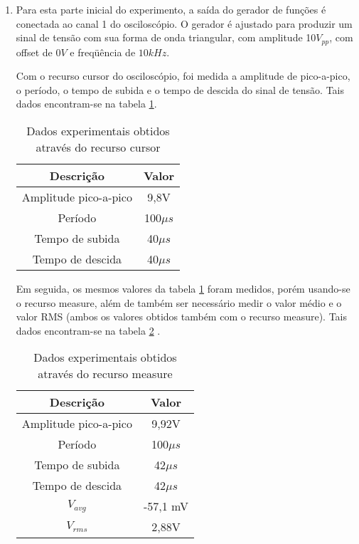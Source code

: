 \documentclass[a4paper]{article} %
\begin{document}
\begin{enumerate}
\item Para esta parte inicial do experimento, a saída do gerador de funções é conectada ao canal 1 do osciloscópio. O gerador é ajustado para produzir um sinal de tensão com sua forma de onda triangular, com amplitude 10$V_{pp}$, com offset de $0V$ e freqüência de $10kHz$. 
 
Com o recurso cursor do osciloscópio, foi medida a amplitude de pico-a-pico, o período, o tempo de subida e o tempo de descida do sinal de tensão. Tais dados encontram-se na tabela \ref{tab:cursors}. 


\begin{table}[h]
\begin{centering}
\begin{tabular}{cc}
\hline 
Descrição & Valor\tabularnewline
\hline
Amplitude pico-a-pico & 9,8V\tabularnewline
Período & 100$\mu s$\tabularnewline
Tempo de subida & 40$\mu s$\tabularnewline
Tempo de descida  & 40$\mu s$\tabularnewline
\hline
\end{tabular}
\par\end{centering}

\caption{Dados experimentais obtidos através do recurso cursor \label{tab:cursors}}

\end{table}


Em seguida, os mesmos valores da tabela \ref{tab:cursors} foram medidos, porém usando-se o recurso measure, além de também ser necessário medir o valor médio e o valor RMS (ambos os valores obtidos também com o recurso measure). Tais dados encontram-se na tabela \ref{tab:measure} . 


\begin{table}[h]
\begin{centering}
\begin{tabular}{cc}
\hline 
Descrição & Valor\tabularnewline
\hline
Amplitude pico-a-pico & 9,92V \tabularnewline
Período & 100$\mu s$\tabularnewline
Tempo de subida & 42$\mu s$\tabularnewline
Tempo de descida  & 42$\mu s$\tabularnewline
$V_{avg}$ & -57,1 mV\tabularnewline
$V_{rms}$ & 2,88V \tabularnewline
\hline
\end{tabular}
\par\end{centering}

\caption{Dados experimentais obtidos através do recurso measure \label{tab:measure}}

\end{table}


\end{enumerate}
\end{document}
